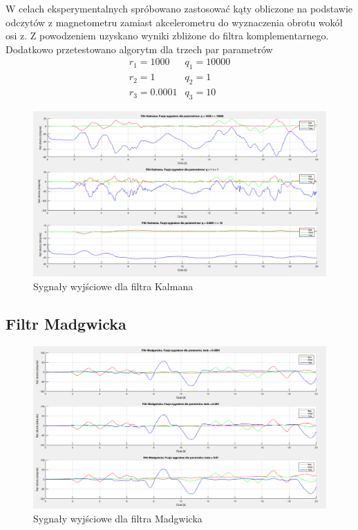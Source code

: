 W celach eksperymentalnych spróbowano zastosować kąty obliczone na podstawie odczytów z magnetometru zamiast akcelerometru do wyznaczenia obrotu wokół osi z. Z powodzeniem uzyskano wyniki zbliżone do filtra komplementarnego. Dodatkowo przetestowano algorytm dla trzech par parametrów
$$
    \begin{array}{ll}
        r_1 = 1000 & q_1 = 10000 \\
        r_2 = 1 & q_2 = 1 \\
        r_3 = 0.0001 & q_3 = 10 
    \end{array}
$$
\begin{figure}[h!]
    \centering
    \includegraphics[width=1\textwidth]{Rysunki/Rozdzial04/Filtr_Kalmana_po.png}
    \caption{Sygnały wyjściowe dla filtra Kalmana}
    \label{Kalman po}
\end{figure}

\subsection{Filtr Madgwicka}

\begin{figure}[h!]
    \centering
    \includegraphics[width=1\textwidth]{Rysunki/Rozdzial04/Filtr_Madgwicka_po.png}
    \caption{Sygnały wyjściowe dla filtra Madgwicka}
    \label{Madgwick po}
\end{figure}

